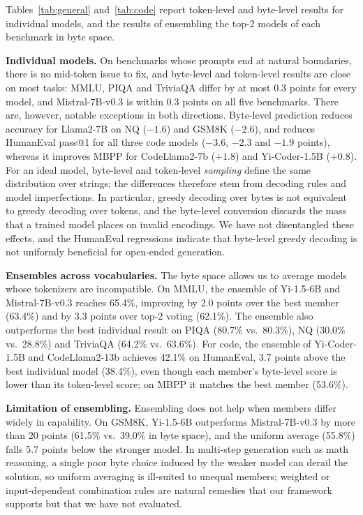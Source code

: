 \documentclass{article} %
\begin{document}
Tables~\ref{tab:general} and~\ref{tab:code} report token-level and byte-level results for individual models, and the results of ensembling the top-2 models of each benchmark in byte space.

\textbf{Individual models.} On benchmarks whose prompts end at natural boundaries, there is no mid-token issue to fix, and byte-level and token-level results are close on most tasks: MMLU, PIQA and TriviaQA differ by at most 0.3 points for every model, and Mistral-7B-v0.3 is within 0.3 points on all five benchmarks. There are, however, notable exceptions in both directions. Byte-level prediction reduces accuracy for Llama2-7B on NQ ($-1.6$) and GSM8K ($-2.6$), and reduces HumanEval pass@1 for all three code models ($-3.6$, $-2.3$ and $-1.9$ points), whereas it improves MBPP for CodeLlama2-7b ($+1.8$) and Yi-Coder-1.5B ($+0.8$). For an ideal model, byte-level and token-level \emph{sampling} define the same distribution over strings; the differences therefore stem from decoding rules and model imperfections. In particular, greedy decoding over bytes is not equivalent to greedy decoding over tokens, and the byte-level conversion discards the mass that a trained model places on invalid encodings. We have not disentangled these effects, and the HumanEval regressions indicate that byte-level greedy decoding is not uniformly beneficial for open-ended generation.

\textbf{Ensembles across vocabularies.} The byte space allows us to average models whose tokenizers are incompatible. On MMLU, the ensemble of Yi-1.5-6B and Mistral-7B-v0.3 reaches 65.4\%, improving by 2.0 points over the best member (63.4\%) and by 3.3 points over top-2 voting (62.1\%). The ensemble also outperforms the best individual result on PIQA (80.7\% vs.\ 80.3\%), NQ (30.0\% vs.\ 28.8\%) and TriviaQA (64.2\% vs.\ 63.6\%). For code, the ensemble of Yi-Coder-1.5B and CodeLlama2-13b achieves 42.1\% on HumanEval, 3.7 points above the best individual model (38.4\%), even though each member's byte-level score is lower than its token-level score; on MBPP it matches the best member (53.6\%).

\textbf{Limitation of ensembling.} Ensembling does not help when members differ widely in capability. On GSM8K, Yi-1.5-6B outperforms Mistral-7B-v0.3 by more than 20 points (61.5\% vs.\ 39.0\% in byte space), and the uniform average (55.8\%) falls 5.7 points below the stronger model. In multi-step generation such as math reasoning, a single poor byte choice induced by the weaker model can derail the solution, so uniform averaging is ill-suited to unequal members; weighted or input-dependent combination rules are natural remedies that our framework supports but that we have not evaluated.
\end{document}
